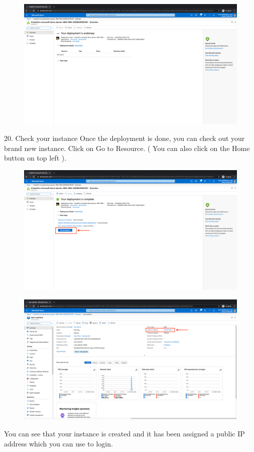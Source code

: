 \begin{figure}[H]
\begin{center} 
\includegraphics[scale=0.20]{figures/vm24}
\end{center}
\end{figure}

20. Check your instance
Once the deployment is done,  you can check out your brand new instance. Click on Go to Resource. ( You can also click on the Home button on top left ).

\begin{figure}[H]
\begin{center} 
\includegraphics[scale=0.20]{figures/vm25}
\end{center}
\end{figure}

\begin{figure}[H]
\begin{center} 
\includegraphics[scale=0.20]{figures/vm26}
\end{center}
\end{figure}

You can see that your instance is created and it has been assigned a public IP address which you can use to login.
